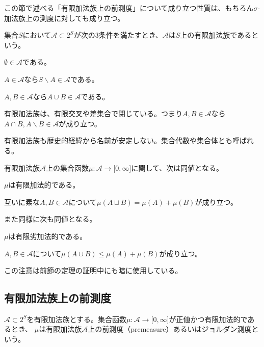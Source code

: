 \documentclass[../root.tex]{subfiles}
\begin{document}
この節で述べる「有限加法族上の前測度」について成り立つ性質は、もちろん$ \sigma $-加法族上の測度に対しても成り立つ。

\begin{Def}{}{}
集合$ S $において$ \mathscr{A}\subset 2^{S} $が次の3条件を満たすとき、$ \mathscr{A} $は$ S $上の有限加法族であるという。
\begin{EnumCond}
\item $ \emptyset\in\mathscr{A} $である。
\item $ A\in\mathscr{A} $なら$ S\backslash A\in\mathscr{A} $である。
\item $ A, B\in\mathscr{A} $なら$ A\cup B\in\mathscr{A} $である。
\end{EnumCond}

\end{Def}

有限加法族は、有限交叉や差集合で閉じている。つまり$ A, B\in\mathscr{A} $なら$ A\cap B, A\backslash B\in\mathscr{A} $が成り立つ。

有限加法族も歴史的経緯から名前が安定しない。集合代数や集合体とも呼ばれる。

\begin{Rem}{}{}
有限加法族$ \mathscr{A} $上の集合函数$ \mu\colon\mathscr{A}\rightarrow\lbrack 0, \infty \rbrack $に関して、次は同値となる。
\begin{EnumEquiv}
\item $ \mu $は有限加法的である。
\item 互いに素な$ A, B\in\mathscr{A} $について$ \mu( A\sqcup B )=\mu( A )+\mu( B ) $が成り立つ。
\end{EnumEquiv}

また同様に次も同値となる。
\begin{EnumEquiv}
\item $ \mu $は有限劣加法的である。
\item $ A, B\in\mathscr{A} $について$ \mu( A\cup B )\le\mu( A )+\mu( B ) $が成り立つ。
\end{EnumEquiv}
\end{Rem}

この注意は前節の定理の証明中にも暗に使用している。




\subsection{有限加法族上の前測度}
\begin{Def}{}{}
$ \mathscr{A}\subset 2^{S} $を有限加法族とする。集合函数$ \mu\colon\mathscr{A}\rightarrow\lbrack 0, \infty \rbrack $が正値かつ有限加法的であるとき、
$ \mu $は有限加法族$ \mathscr{A} $上の前測度（premeasure）あるいはジョルダン測度という。
\end{Def}
\end{document}
